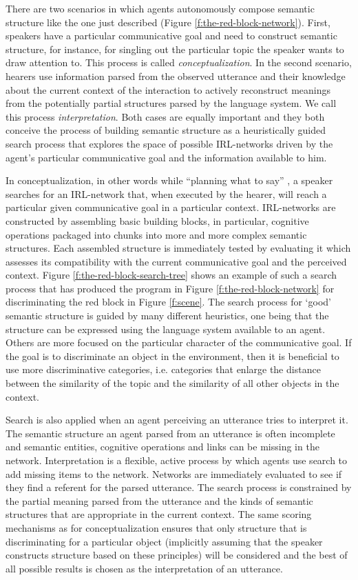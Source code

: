 There are two scenarios in which agents autonomously compose semantic
structure like the one just described (Figure \ref{f:the-red-block-network}). 
First, speakers have a particular communicative goal and need to construct 
semantic structure, for instance, for singling out the particular topic the 
speaker wants to draw attention to.
This process is called \emph{conceptualization}. In the second scenario, 
hearers use information parsed from the observed utterance and their 
knowledge about the current context of the interaction to 
actively reconstruct meanings from the potentially partial 
structures parsed by the language system. We call this process 
\emph{interpretation}. Both cases are equally important and
they both conceive the process of building semantic structure as a heuristically
guided search process that explores the space of possible IRL-networks 
driven by the agent's particular communicative goal and the information
available to him.

In conceptualization, in other words while ``planning what to say'' 
\citep{steels2005planning}, a speaker searches for an IRL-network 
that, when executed by the hearer, will reach a particular given 
communicative goal in a particular context.  IRL-networks 
are constructed by assembling basic building
blocks, in particular, cognitive operations packaged into chunks
into more and more complex semantic structures. 
Each assembled structure is immediately tested by evaluating it which assesses
its compatibility with the current communicative goal and the perceived context.
Figure \ref{f:the-red-block-search-tree} shows an example of such a search process 
that has produced the program in Figure \ref{f:the-red-block-network} for discriminating 
the red block in Figure \ref{f:scene}. 
The search process for `good' semantic structure is guided by 
many different heuristics, one being that the structure can be expressed using the
language system available to an agent. Others are more focused on the particular
character of the communicative goal. If the goal is to discriminate an object 
in the environment, then it is beneficial to use more discriminative categories, 
i.e. categories that enlarge the distance between the similarity of the topic and 
the similarity of all other objects in the context. 

Search is also applied when an agent perceiving an utterance  tries to 
interpret it. The semantic structure an agent 
parsed from an utterance is often incomplete and
semantic entities, cognitive operations and links can be
missing in the network. Interpretation is a flexible, active process
by which agents use search to add missing items to the network.
Networks are immediately evaluated to see if they find a referent for 
the parsed utterance. The search process is constrained by the partial 
meaning parsed from the utterance and
the kinds of semantic structures that are appropriate in the current context.
The same scoring mechanisms
as for conceptualization ensures that only structure that is 
discriminating for a particular object (implicitly assuming that the 
speaker constructs structure based on these principles) will be considered 
and the best of all possible results is chosen as the interpretation of an utterance. 

